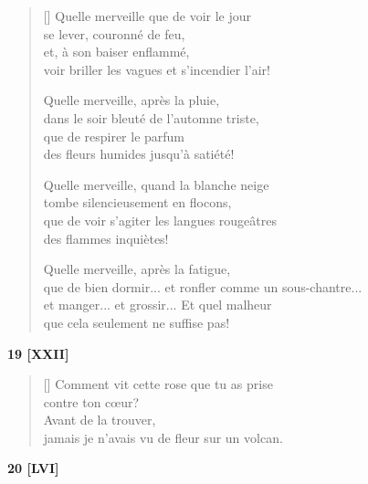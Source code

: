\documentclass[a4paper,12pt]{book}
\begin{document}
\begin{verse}[\versewidth]
  Quelle merveille que de voir le jour \\
  se lever, couronné de feu, \\
  et, à son baiser enflammé, \\
  voir briller les vagues et s'incendier l'air!

  Quelle merveille, après la pluie, \\
  dans le soir bleuté de l'automne triste, \\
  que de respirer le parfum \\
  des fleurs humides jusqu'à satiété!

  Quelle merveille, quand la blanche neige \\
  tombe silencieusement en flocons, \\
  que de voir s'agiter les langues rougeâtres \\
  des flammes inquiètes!

  Quelle merveille, après la fatigue, \\
  que de bien dormir... et ronfler comme un sous-chantre... \\
  et manger... et grossir... Et quel malheur \\
  que cela seulement ne suffise pas!
\end{verse}

\bigskip

\begin{center}
  \textbf{19 [XXII]}
\end{center}

\settowidth{\versewidth}{Comment vit cette rose que tu as prise}

\begin{verse}[\versewidth]
  Comment vit cette rose que tu as prise \\
  contre ton cœur? \\
  Avant de la trouver, \\
  jamais je n'avais vu de fleur sur un volcan.
\end{verse}

\bigskip

\begin{center}
  \textbf{20 [LVI]}
\end{center}

\settowidth{\versewidth}{Aujourd'hui comme hier, demain comme aujourd'hui,}
\end{document}

